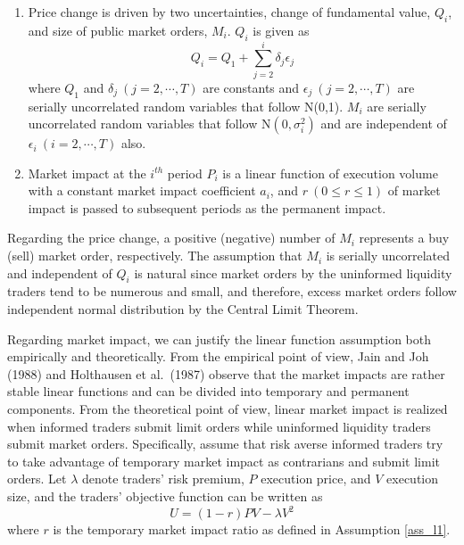 \begin{assumption}\label{ass_l1}
\quad
\begin{enumerate}
\item Price change is driven by two uncertainties, change of fundamental value, $Q_i$, and size of public market orders, $M_i$.  $Q_i$ is given as 
\[ %
   Q_i = Q_1 + \sum_{j=2}^i \delta_j \epsilon_j
\] %
where $Q_1$ and $\delta_j\ (j=2,\cdots,T)$ are constants and
      $\epsilon_j\ (j=2,\cdots,T)$ are serially uncorrelated random
      variables that follow N(0,1).  $M_i$ are serially uncorrelated
      random variables that follow $\mbox{N}(0,\sigma_i^2)$ and are
      independent of $\epsilon_i\ (i=2,\cdots,T)$ also.
\item Market impact at the $i^{th}$ period $P_i$ is a linear function of execution volume with a constant market impact coefficient $a_i$, and $r \ (0 \leq r \leq 1)$ of market impact is passed to subsequent periods as the permanent impact.
\end{enumerate}
\end{assumption}

Regarding the price change, a positive (negative) number of $M_i$ represents a buy (sell) market order, respectively.  The assumption that $M_i$ is serially uncorrelated and independent of $Q_i$ is natural since market orders by the uninformed liquidity traders tend to be numerous and small, and therefore, excess market orders follow independent normal distribution by the Central Limit Theorem.

Regarding market impact, we can justify the linear function assumption both empirically and theoretically.  From the empirical point of view, Jain and Joh (1988) and Holthausen et al.~(1987) observe that the market impacts are rather stable linear functions and can be divided into temporary and permanent components.  From the theoretical point of view, linear market impact is realized when informed traders submit limit orders while uninformed liquidity traders submit market orders.  Specifically, assume that risk averse informed traders try to take advantage of temporary market impact as contrarians and submit limit orders.  Let $\lambda$ denote traders' risk premium, $P$ execution price, and $V$ execution size, and the traders' objective function can be written as
\[ %
  U = (1-r) P V - \lambda V^2
\] %
where $r$ is the temporary market impact ratio as defined in Assumption \ref{ass_l1}.

